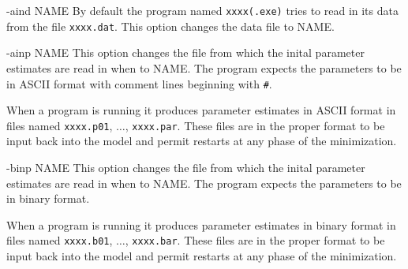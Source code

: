 \beginexample
 -aind NAME 
\endexample
By default the program named {\tt xxxx(.exe)} tries to read in its data
from the file {\tt xxxx.dat}. This option changes the data file to NAME.

\beginexample
 -ainp NAME 
\endexample
This option changes the file from which the inital parameter estimates
are read in when to NAME. The program expects the parameters to
be in  ASCII format with comment lines beginning with {\tt \#}.

When a program is running it produces parameter estimates in ASCII
format in files named {\tt xxxx.p01}, $\ldots$, {\tt xxxx.par}.
These files are in the proper format to be input back into the model
and permit restarts at any phase of the minimization.

\beginexample
 -binp NAME 
\endexample
This option changes the file from which the inital parameter estimates
are read in when to NAME. The program expects the parameters to
be in  binary format.

When a program is running it produces parameter estimates in binary
format in files named {\tt xxxx.b01}, $\ldots$, {\tt xxxx.bar}.
These files are in the proper format to be input back into the model
and permit restarts at any phase of the minimization.

